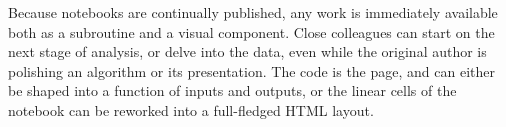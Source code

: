 Because notebooks are continually published, any work is immediately
available both as a subroutine and a visual component. Close colleagues
can start on the next stage of analysis, or delve into the data,
even while the original author is polishing an algorithm or its
presentation. The code is the page, and can either be shaped into
a function of inputs and outputs, or the linear cells of the notebook
can be reworked into a full-fledged HTML layout.
